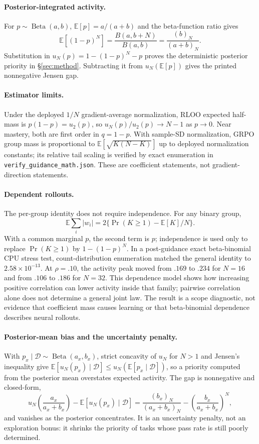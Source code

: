 \paragraph{Posterior-integrated activity.}
For $p\sim\operatorname{Beta}(a,b)$,
$\mathbb E[p]=a/(a+b)$ and the beta-function ratio gives
\[
\mathbb E[(1-p)^N]
=\frac{B(a,b+N)}{B(a,b)}
=\frac{(b)_N}{(a+b)_N}.
\]
Substitution in $u_N(p)=1-(1-p)^N-p$ proves the deterministic posterior
priority in \S\ref{sec:method}. Subtracting it from $u_N(\mathbb E[p])$
gives the printed nonnegative Jensen gap.

\paragraph{Estimator limits.}
Under the deployed $1/N$ gradient-average normalization, RLOO expected half-mass is
$p(1-p)=u_2(p)$, so $u_N(p)/u_2(p)\to N-1$ as $p\to0$. Near mastery,
both are first order in $q=1-p$. With sample-SD normalization, GRPO group
mass is proportional to $\mathbb E[\sqrt{K(N-K)}]$ up to deployed
normalization constants; its relative tail scaling is verified by exact
enumeration in \texttt{verify\_guidance\_math.json}. These are coefficient
statements, not gradient-direction statements.

\paragraph{Dependent rollouts.}
The per-group identity does not require independence. For any binary group,
\[
\mathbb E\sum_i|w_i|=2\{\Pr(K\ge1)-\mathbb E[K]/N\}.
\]
With a common marginal $p$, the second term is $p$; independence is used only
to replace $\Pr(K\ge1)$ by $1-(1-p)^N$. In a post-guidance exact
beta-binomial CPU stress
test, count-distribution enumeration matched the general identity to
$2.58\times10^{-13}$. At $\rho=.10$, the activity peak moved from $.169$ to
$.234$ for $N=16$ and from $.106$ to $.186$ for $N=32$. This dependence model
shows how increasing positive correlation can lower activity inside that
family; pairwise correlation alone does not determine a general joint law.
The result is a scope diagnostic, not evidence that coefficient mass causes
learning or that beta-binomial dependence describes neural rollouts.

\paragraph{Posterior-mean bias and the uncertainty penalty.}
With $p_x\mid\mathcal D\sim\operatorname{Beta}(a_x,b_x)$, strict concavity of
$u_N$ for $N>1$ and Jensen's inequality give
$\mathbb E[u_N(p_x)\mid\mathcal D]\leq u_N(\mathbb E[p_x\mid\mathcal D])$, so a
priority computed from the posterior mean overstates expected activity. The
gap is nonnegative and closed-form,
\[
u_N\!\left(\frac{a_x}{a_x+b_x}\right)-\mathbb E[u_N(p_x)\mid\mathcal D]
=\frac{(b_x)_N}{(a_x+b_x)_N}-\left(\frac{b_x}{a_x+b_x}\right)^N,
\]
and vanishes as the posterior concentrates. It is an uncertainty penalty, not
an exploration bonus: it shrinks the priority of tasks whose pass rate is
still poorly determined.

